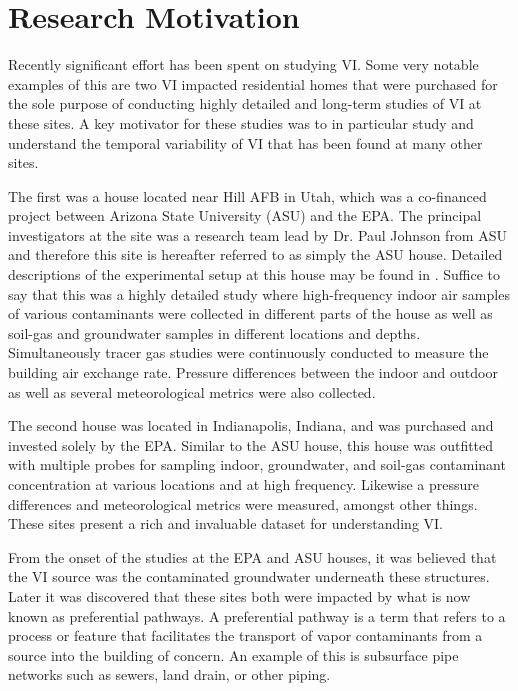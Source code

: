 
\section{Research Motivation}

Recently significant effort has been spent on studying VI.
Some very notable examples of this are two VI impacted residential homes that were purchased for the sole purpose of conducting highly detailed and long-term studies of VI at these sites.
A key motivator for these studies was to in particular study and understand the temporal variability of VI that has been found at many other sites.\par

The first was a house located near Hill AFB in Utah, which was a co-financed project between Arizona State University (ASU) and the EPA.
The principal investigators at the site was a research team lead by Dr. Paul Johnson from ASU and therefore this site is hereafter referred to as simply the ASU house.
Detailed descriptions of the experimental setup at this house may be found in .%
Suffice to say that this was a highly detailed study where high-frequency indoor air samples of various contaminants were collected in different parts of the house as well as soil-gas and groundwater samples in different locations and depths.
Simultaneously tracer gas studies were continuously conducted to measure the building air exchange rate.
Pressure differences between the indoor and outdoor as well as several meteorological metrics were also collected.\par

The second house was located in Indianapolis, Indiana, and was purchased and invested solely by the EPA.
Similar to the ASU house, this house was outfitted with multiple probes for sampling indoor, groundwater, and soil-gas contaminant concentration at various locations and at high frequency.
Likewise a pressure differences and meteorological metrics were measured, amongst other things.
These sites present a rich and invaluable dataset for understanding VI.\par

From the onset of the studies at the EPA and ASU houses, it was believed that the VI source was the contaminated groundwater underneath these structures.
Later it was discovered that these sites both were impacted by what is now known as preferential pathways.
A preferential pathway is a term that refers to a process or feature that facilitates the transport of vapor contaminants from a source into the building of concern.
An example of this is subsurface pipe networks such as sewers, land drain, or other piping.\par

